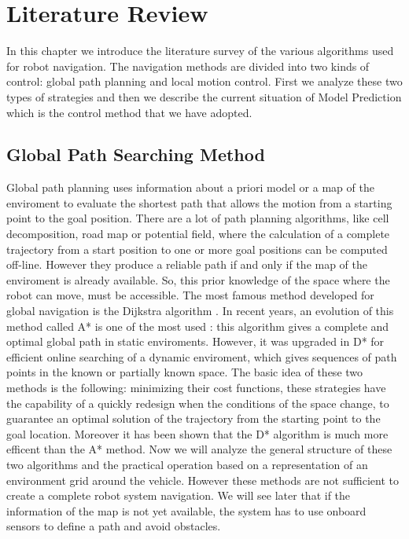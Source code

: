 \chapter{Literature Review}
In this chapter we introduce the literature survey of the various algorithms used for robot navigation. The navigation methods are divided into two kinds of control: global path planning and local motion control. First we analyze these two types of strategies and then we describe the current situation of Model Prediction which is the control method that we have adopted.
\section{Global Path Searching Method}
Global path planning uses information about a priori model or a map of the enviroment to evaluate the shortest path that allows the motion from a starting point to the goal position.
There are a lot of path planning algorithms, like cell decomposition, road map or potential field, where the calculation of a complete trajectory from a start position to one or more goal positions can be computed off-line. However they produce a reliable path if and only if the map of the enviroment is already available. So, this prior knowledge of the space where the robot can move, must be accessible.
The most famous method developed for global navigation is the Dijkstra algorithm \cite{Dijkstra:1959}. In recent years, an evolution of this method called A* is one of the most used \cite{Hart:1968}: this algorithm gives a complete and optimal global path in static enviroments. However, it was upgraded in D* \cite{Stentz93optimaland} for efficient online searching of a dynamic enviroment, which gives sequences of path points in the known or partially known space. The basic idea of these two methods is the following: minimizing their cost functions, these strategies have the capability of a quickly  redesign when the conditions of the space change, to guarantee an optimal solution of the trajectory from the starting point to the goal location. Moreover it has been shown that the D* algorithm is much more efficent than the A* method. Now we will analyze the general structure of these two algorithms and the practical operation based on a representation of an environment grid around the vehicle. However these methods are not sufficient to create a complete robot system navigation. We will see later that if the information of the map is not yet available, the system has to use onboard sensors to define a path and avoid obstacles.

